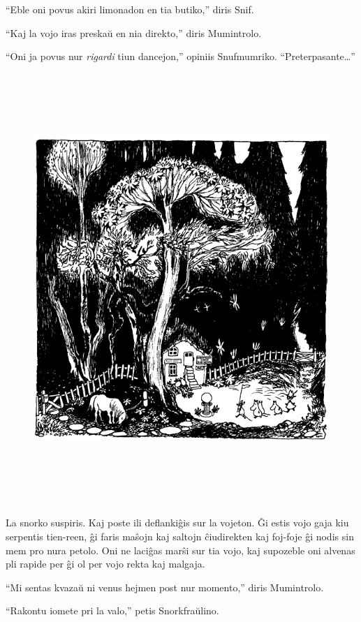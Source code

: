 ``Eble oni povus akiri limonadon en tia butiko,'' diris Snif.

``Kaj la vojo iras preskaŭ en nia direkto,'' diris Mumintrolo.

``Oni ja povus nur \emph{rigardi} tiun dancejon,'' opiniis Snufmumriko. ``Preterpasante{\ldots}''

\begin{figure}[htbp]
\centering
\includegraphics[width=445pt,height=462pt]{6-2.png}
\caption{}
\label{6-2}
\end{figure}

La snorko suspiris. Kaj poste ili deflankiĝis sur la vojeton. Ĝi estis vojo gaja kiu serpentis tien-reen, ĝi faris maŝojn kaj saltojn ĉiudirekten kaj foj-foje ĝi nodis sin mem pro nura petolo. Oni ne laciĝas marŝi sur tia vojo, kaj supozeble oni alvenas pli rapide per ĝi ol per vojo rekta kaj malgaja.

``Mi sentas kvazaŭ ni venus hejmen post nur momento,'' diris Mumintrolo.

``Rakontu iomete pri la valo,'' petis Snorkfraŭlino.

